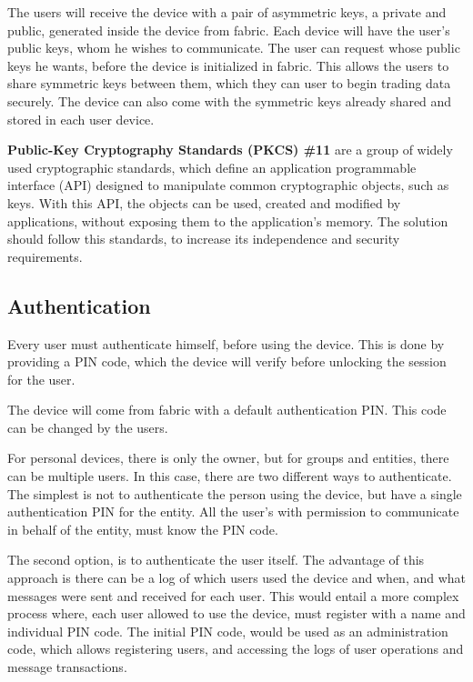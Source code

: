 The users will receive the device with a pair of asymmetric keys, a private and public, generated inside the device from fabric. Each device will have the user's public keys, whom he wishes to communicate. The user can request whose public keys he wants, before the device is initialized in fabric. This allows the users to share symmetric keys between them, which they can user to begin trading data securely. The device can also come with the symmetric keys already shared and stored in each user device.

\textbf{Public-Key Cryptography Standards (PKCS) \#11} are a group of widely used cryptographic standards, which define an application programmable interface (API) designed to manipulate common cryptographic objects, such as keys.
With this API, the objects can be used, created and modified by applications, without exposing them to the application's memory.
The solution should follow this standards, to increase its independence and security requirements.

\subsection{Authentication} \label{chap:problem:services:auth}
Every user must authenticate himself, before using the device. This is done by providing a PIN code, which the device will verify before unlocking the session for the user.

The device will come from fabric with a default authentication PIN. This code can be changed by the users.

For personal devices, there is only the owner, but for groups and entities, there can be multiple users. In this case, there are two different ways to authenticate. The simplest is not to authenticate the person using the device, but have a single authentication PIN for the entity. All the user's with permission to communicate in behalf of the entity, must know the PIN code.

The second option, is to authenticate the user itself. The advantage of this approach is there can be a log of which users used the device and when, and what messages were sent and received for each user.
This would entail a more complex process where, each user allowed to use the device, must register with a name and individual PIN code. The initial PIN code, would be used as an administration code, which allows registering users, and accessing the logs of user operations and message transactions.

